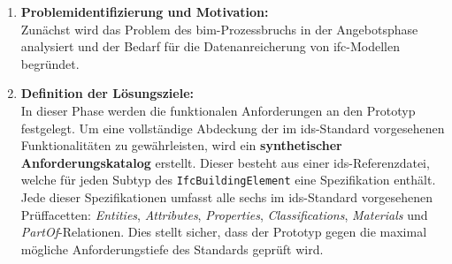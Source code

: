 \begin{enumerate}
    \item \textbf{Problemidentifizierung und Motivation:} \\
    Zunächst wird das Problem des \gls{bim}-Prozessbruchs in der Angebotsphase analysiert und der Bedarf für die Datenanreicherung von \gls{ifc}-Modellen begründet.

    \item \textbf{Definition der Lösungsziele:} \\
    In dieser Phase werden die funktionalen Anforderungen an den Prototyp festgelegt. 
    Um eine vollständige Abdeckung der im \gls{ids}-Standard vorgesehenen Funktionalitäten 
    zu gewährleisten, wird ein \textbf{synthetischer Anforderungskatalog} erstellt. 
    Dieser besteht aus einer \gls{ids}-Referenzdatei, welche für jeden Subtyp des 
    \texttt{IfcBuildingElement} eine Spezifikation enthält. Jede dieser Spezifikationen 
    umfasst alle sechs im \gls{ids}-Standard vorgesehenen Prüffacetten: 
    \textit{Entities}, \textit{Attributes}, \textit{Properties}, \textit{Classifications}, 
    \textit{Materials} und \textit{PartOf}-Relationen. Dies stellt sicher, dass der Prototyp 
    gegen die maximal mögliche Anforderungstiefe des Standards geprüft wird.


\end{enumerate}
